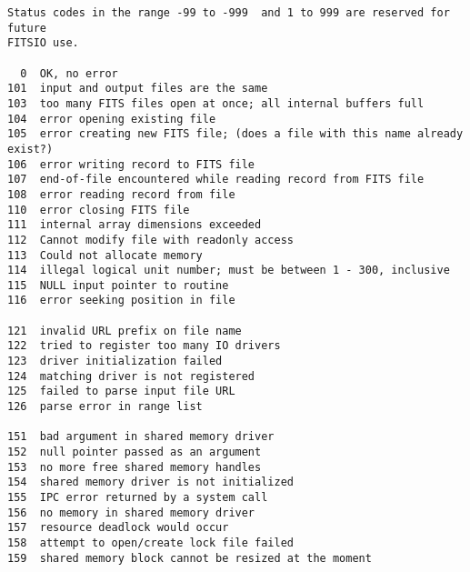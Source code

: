 \documentclass[11pt]{book}
\begin{document}
\begin{verbatim}
Status codes in the range -99 to -999  and 1 to 999 are reserved for future
FITSIO use.

  0  OK, no error
101  input and output files are the same
103  too many FITS files open at once; all internal buffers full
104  error opening existing file
105  error creating new FITS file; (does a file with this name already exist?)
106  error writing record to FITS file
107  end-of-file encountered while reading record from FITS file
108  error reading record from file
110  error closing FITS file
111  internal array dimensions exceeded
112  Cannot modify file with readonly access
113  Could not allocate memory
114  illegal logical unit number; must be between 1 - 300, inclusive
115  NULL input pointer to routine
116  error seeking position in file

121  invalid URL prefix on file name
122  tried to register too many IO drivers
123  driver initialization failed
124  matching driver is not registered
125  failed to parse input file URL
126  parse error in range list

151  bad argument in shared memory driver
152  null pointer passed as an argument
153  no more free shared memory handles
154  shared memory driver is not initialized
155  IPC error returned by a system call
156  no memory in shared memory driver
157  resource deadlock would occur
158  attempt to open/create lock file failed
159  shared memory block cannot be resized at the moment



\end{verbatim}
\end{document}
